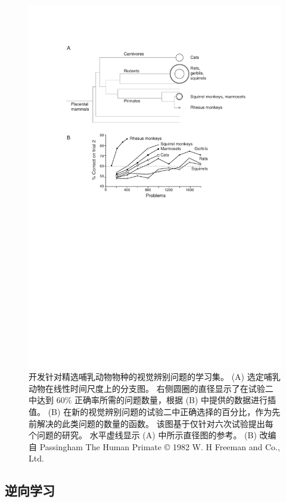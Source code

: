 \begin{figure} 
	\centering
	\includegraphics[width=0.7\linewidth]{chap8/fig_8_2}
	\caption{开发针对精选哺乳动物物种的视觉辨别问题的学习集。
	(A) 选定哺乳动物在线性时间尺度上的分支图。
	右侧圆圈的直径显示了在试验二中达到 60\% 正确率所需的问题数量，根据 (B) 中提供的数据进行插值。 (B) 在新的视觉辨别问题的试验二中正确选择的百分比，作为先前解决的此类问题的数量的函数。 该图基于仅针对六次试验提出每个问题的研究。 水平虚线显示 (A) 中所示直径图的参考。 (B) 改编自 Passingham The Human Primate © 1982 W. H Freeman and Co., Ltd. \label{fig:8_2}}
\end{figure}



\subsection{逆向学习}


